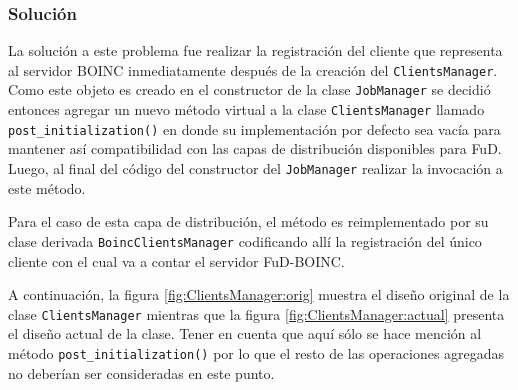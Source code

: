 	\subsubsection{Solución}
La solución a este problema fue realizar la registración del cliente que representa al servidor BOINC inmediatamente después de la creación del \texttt{ClientsManager}. Como este objeto es creado en el constructor de la clase \texttt{JobManager} se decidió entonces agregar un nuevo método virtual a la clase \texttt{ClientsManager} llamado \texttt{post\_initialization()} en donde su implementación por defecto sea vacía para mantener así compatibilidad con las capas de distribución disponibles para FuD. Luego, al final del código del constructor del \texttt{JobManager} realizar la invocación a este método.

Para el caso de esta capa de distribución, el método es reimplementado por su clase derivada \texttt{BoincClientsManager} codificando allí la registración del único cliente con el cual va a contar el servidor FuD-BOINC.

A continuación, la figura \ref{fig:ClientsManager:orig} muestra el diseño original de la clase \texttt{ClientsManager} mientras que la figura \ref{fig:ClientsManager:actual} presenta el diseño actual de la clase. Tener en cuenta que aquí sólo se hace mención al método \texttt{post\_initialization()} por lo que el resto de las operaciones agregadas no deberían ser consideradas en este punto.

